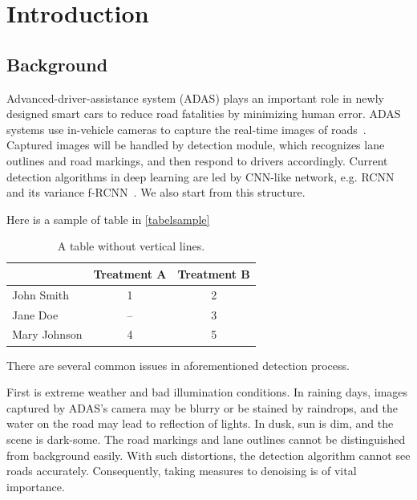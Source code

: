 
\chapter{Introduction}
\begin{spacing}{1.5}
\setlength{\parskip}{0.3in}

\section{Background}

Advanced-driver-assistance system (ADAS) plays an important role in newly designed smart cars to reduce road fatalities by minimizing human error. ADAS systems use in-vehicle cameras to capture the real-time images of roads~\cite{ziebinski2016survey}. Captured images will be handled by detection module, which recognizes lane outlines and road markings, and then respond to drivers accordingly. Current detection algorithms in deep learning are led by CNN-like network, e.g. RCNN~\cite{girshick2014rich} and its variance f-RCNN~\cite{girshick2015fast}. We also start from this structure.

Here is a sample of table in \autoref{tabelsample}

\begin{table}[ht]
\centering
\caption{A table without vertical lines.}
\label{tabelsample}
\begin{tabular}[t]{lcc}
\hline
&Treatment A&Treatment B\\
\hline
John Smith&1&2\\
Jane Doe&--&3\\
Mary Johnson&4&5\\
\hline
\end{tabular}
\end{table}%

There are several common issues in aforementioned detection process. 

First is extreme weather and bad illumination conditions. In raining days, images captured by ADAS’s camera may be blurry or be stained by raindrops, and the water on the road may lead to reflection of lights. In dusk, sun is dim, and the scene is dark-some. The road markings and lane outlines cannot be distinguished from background easily. With such distortions, the detection algorithm cannot see roads accurately. Consequently, taking measures to denoising is of vital importance. 


\end{spacing}
